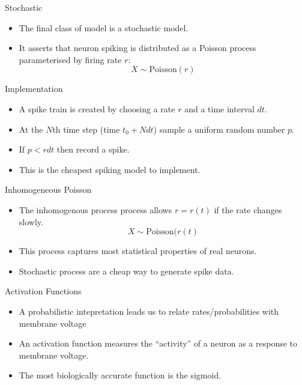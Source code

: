 \documentclass[
  ignorenonframetext,
]{beamer}
\begin{document}
\begin{frame}{Stochastic}
\protect\hypertarget{stochastic}{}
\begin{itemize}
\item
  The final class of model is a stochastic model.
\item
  It asserts that neuron spiking is distributed as a Poisson process
  parameterised by firing rate \(r\): \[X \sim \text{Poisson}(r)\]
\end{itemize}
\end{frame}

\begin{frame}{Implementation}
\protect\hypertarget{implementation}{}
\begin{itemize}
\item
  A spike train is created by choosing a rate \(r\) and a time interval
  \(dt\).
\item
  At the \(N\)th time step (time \(t_0 + N dt\)) sample a uniform random
  number \(p\).
\item
  If \(p < r dt\) then record a spike.
\item
  This is the cheapest spiking model to implement.
\end{itemize}
\end{frame}

\begin{frame}{Inhomogeneous Poisson}
\protect\hypertarget{inhomogeneous-poisson}{}
\begin{itemize}
\item
  The inhomogenous process process allows \(r = r(t)\) if the rate
  changes slowly. \[X\sim\text{Poisson}(r(t)\]
\item
  This process captures most statistical properties of real neurons.
\item
  Stochastic process are a cheap way to generate spike data.
\end{itemize}
\end{frame}

\begin{frame}{Activation Functions}
\protect\hypertarget{activation-functions}{}
\begin{itemize}
\item
  A probabilistic intepretation leads us to relate rates/probabilities
  with membrane voltage
\item
  An activation function measures the ``activity'' of a neuron as a
  response to membrane voltage.
\item
  The most biologically accurate function is the sigmoid.
\end{itemize}
\end{frame}
\end{document}
